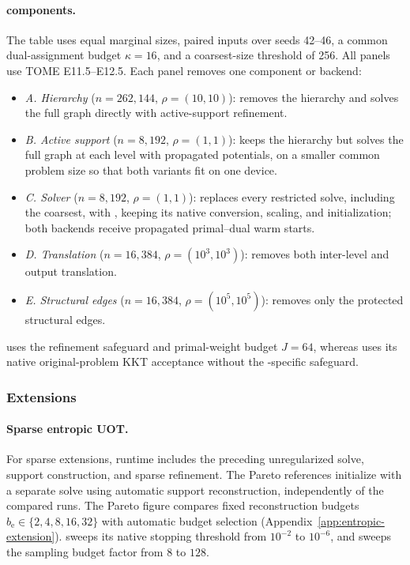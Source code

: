 \paragraph{\ours components.}
The table uses equal marginal sizes, paired inputs over seeds 42--46, a common dual-assignment budget $\kappa=16$, and a coarsest-size threshold of 256.
All panels use TOME E11.5--E12.5.
Each panel removes one component or backend:
\begin{itemize}
\item \emph{A. Hierarchy} ($n=262{,}144$, $\rho=(10,10)$): removes the hierarchy and solves the full graph directly with active-support refinement.
\item \emph{B. Active support} ($n=8{,}192$, $\rho=(1,1)$): keeps the hierarchy but solves the full graph at each level with propagated potentials, on a smaller common problem size so that both variants fit on one device.
\item \emph{C. Solver} ($n=8{,}192$, $\rho=(1,1)$): replaces every restricted solve, including the coarsest, with \pdcs, keeping its native conversion, scaling, and initialization; both backends receive propagated primal--dual warm starts.
\item \emph{D. Translation} ($n=16{,}384$, $\rho=(10^3,10^3)$): removes both inter-level and output translation.
\item \emph{E. Structural edges} ($n=16{,}384$, $\rho=(10^5,10^5)$): removes only the protected structural edges.
\end{itemize}
\subsolver uses the refinement safeguard and primal-weight budget $J=64$, whereas \pdcs uses its native original-problem KKT acceptance without the \subsolver-specific safeguard.

\subsubsection{Extensions}
\label{app:extension-protocols}
\paragraph{Sparse entropic UOT.}
For sparse extensions, runtime includes the preceding unregularized \ours solve, support construction, and sparse refinement.
The Pareto references initialize \ottonline with a separate \ourssparsink solve using automatic support reconstruction, independently of the compared runs.
The Pareto figure compares fixed reconstruction budgets $b_{\mathrm e}\in\{2,4,8,16,32\}$ with automatic budget selection (Appendix~\ref{app:entropic-extension}).
\ottonline sweeps its native stopping threshold from $10^{-2}$ to $10^{-6}$, and \sparsink sweeps the sampling budget factor from $8$ to $128$.

